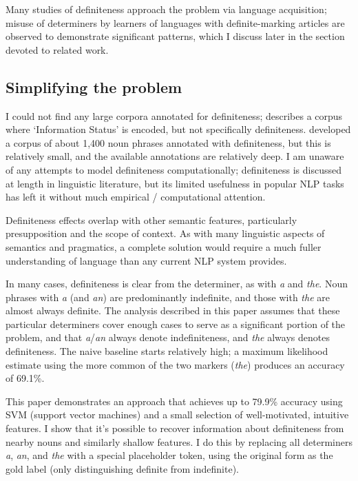 \documentclass[11pt]{article}\usepackage{graphicx, color}
\begin{document}
Many studies of definiteness approach the problem via language acquisition; misuse of determiners by learners of languages with definite-marking articles are observed to demonstrate significant patterns, which I discuss later in the section devoted to related work.

\subsection{Simplifying the problem}
I could not find any large corpora annotated for definiteness; \citet{calhoun:2010} describes a corpus where `Information Status' is encoded, but not specifically definiteness. \citet{vieira:2000} developed a corpus of about 1,400 noun phrases annotated with definiteness, but this is relatively small, and the available annotations are relatively deep. I am unaware of any attempts to model definiteness computationally; definiteness is discussed at length in linguistic literature, but its limited usefulness in popular NLP tasks has left it without much empirical / computational attention.

Definiteness effects overlap with other semantic features, particularly presupposition and the scope of context. As with many linguistic aspects of semantics and pragmatics, a complete solution would require a much fuller understanding of language than any current NLP system provides.

In many cases, definiteness is clear from the determiner, as with \emph{a} and \emph{the}. Noun phrases with \emph{a} (and \emph{an}) are predominantly indefinite, and those with \emph{the} are almost always definite. The analysis described in this paper assumes that these particular determiners cover enough cases to serve as a significant portion of the problem, and that \emph{a}/\emph{an} always denote indefiniteness, and \emph{the} always denotes definiteness. The naive baseline starts relatively high; a maximum likelihood estimate using the more common of the two markers (\emph{the}) produces an accuracy of 69.1\%.

This paper demonstrates an approach that achieves up to 79.9\% accuracy using SVM (support vector machines) and a small selection of well-motivated, intuitive features.
I show that it's possible to recover information about definiteness from nearby nouns and similarly shallow features. I do this by replacing all determiners \emph{a}, \emph{an}, and \emph{the} with a special placeholder token, using the original form as the gold label (only distinguishing definite from indefinite).
\end{document}
